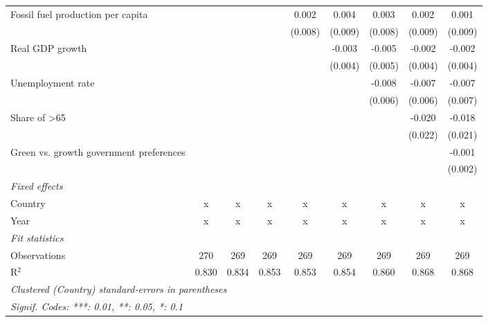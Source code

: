 \begin{table}[htbp]
\begin{tabular}{lcccccccc}
      Fossil fuel production per capita         &         &         &              & 0.002        & 0.004        & 0.003        & 0.002        & 0.001\\   
                                                &         &         &              & (0.008)      & (0.009)      & (0.008)      & (0.009)      & (0.009)\\   
      Real GDP growth                           &         &         &              &              & -0.003       & -0.005       & -0.002       & -0.002\\   
                                                &         &         &              &              & (0.004)      & (0.005)      & (0.004)      & (0.004)\\   
      Unemployment rate                         &         &         &              &              &              & -0.008       & -0.007       & -0.007\\   
                                                &         &         &              &              &              & (0.006)      & (0.006)      & (0.007)\\   
      Share of >65                              &         &         &              &              &              &              & -0.020       & -0.018\\   
                                                &         &         &              &              &              &              & (0.022)      & (0.021)\\   
      Green vs. growth government preferences   &         &         &              &              &              &              &              & -0.001\\   
                                                &         &         &              &              &              &              &              & (0.002)\\   
      \emph{Fixed effects}\\
      Country                                   & x       & x       & x            & x            & x            & x            & x            & x\\  
      Year                                      & x       & x       & x            & x            & x            & x            & x            & x\\  
      \midrule \emph{Fit statistics}\\
      Observations                              & 270     & 269     & 269          & 269          & 269          & 269          & 269          & 269\\  
      R$^2$                                     & 0.830   & 0.834   & 0.853        & 0.853        & 0.854        & 0.860        & 0.868        & 0.868\\  
      \midrule
      \multicolumn{9}{l}{\emph{Clustered (Country) standard-errors in parentheses}}\\
      \multicolumn{9}{l}{\emph{Signif. Codes: ***: 0.01, **: 0.05, *: 0.1}}\\
   \end{tabular}
\end{table}


